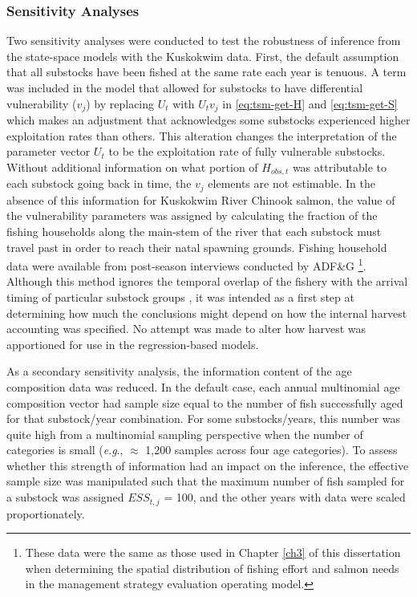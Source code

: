 \documentclass[12pt,]{book}
\let\rmarkdownfootnote\footnote%
\def\footnote{\protect\rmarkdownfootnote}
\theoremstyle{definition}
\theoremstyle{definition}
\theoremstyle{definition}
\theoremstyle{remark}
\begin{document}
\subsubsection{Sensitivity Analyses}\label{sens-analysis}

\noindent
Two sensitivity analyses were conducted to test the robustness of
inference from the state-space models with the Kuskokwim data. First,
the default assumption that all substocks have been fished at the same
rate each year is tenuous. A term was included in the model that allowed
for substocks to have differential vulnerability (\(v_j\)) by replacing
\(U_t\) with \(U_tv_j\) in \eqref{eq:tsm-get-H} and \eqref{eq:tsm-get-S}
which makes an adjustment that acknowledges some substocks experienced
higher exploitation rates than others. This alteration changes the
interpretation of the parameter vector \(U_t\) to be the exploitation
rate of fully vulnerable substocks. Without additional information on
what portion of \(H_{obs,t}\) was attributable to each substock going
back in time, the \(v_j\) elements are not estimable. In the absence of
this information for Kuskokwim River Chinook salmon, the value of the
vulnerability parameters was assigned by calculating the fraction of the
fishing households along the main-stem of the river that each substock
must travel past in order to reach their natal spawning grounds. Fishing
household data were available from post-season interviews conducted by
ADF\&G
\citep[\emph{e}.\emph{g}.,][]{hamazaki-2011, shelden-etal-2016b}\footnote{These
  data were the same as those used in Chapter \ref{ch3} of this
  dissertation when determining the spatial distribution of fishing
  effort and salmon needs in the management strategy evaluation
  operating model.}. Although this method ignores the temporal overlap
of the fishery \citep{hamazaki-2008} with the arrival timing of
particular substock groups
\citep{smith-liller-2017a, smith-liller-2017b}, it was intended as a
first step at determining how much the conclusions might depend on how
the internal harvest accounting was specified. No attempt was made to
alter how harvest was apportioned for use in the regression-based
models.

As a secondary sensitivity analysis, the information content of the age
composition data was reduced. In the default case, each annual
multinomial age composition vector had sample size equal to the number
of fish successfully aged for that substock/year combination. For some
substocks/years, this number was quite high from a multinomial sampling
perspective when the number of categories is small (\emph{e}.\emph{g}.,
\(\approx\) 1,200 samples across four age categories). To assess whether
this strength of information had an impact on the inference, the
effective sample size was manipulated such that the maximum number of
fish sampled for a substock was assigned \(ESS_{t,j}\) = 100, and the
other years with data were scaled proportionately.
\end{document}
